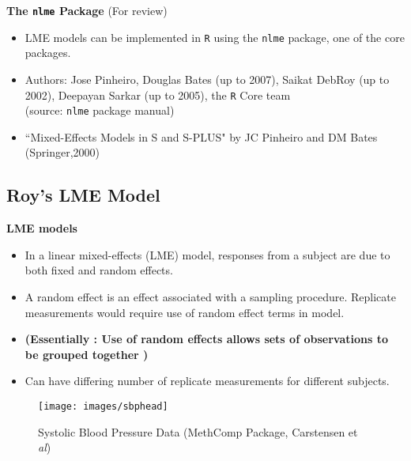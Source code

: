 \documentclass[compress]{beamer}        %
\makeatletter
\newcommand{\tcb}{\textcolor{beamer@blendedblue}}
\makeatother
\begin{document}
		\begin{frame}{\bf \tcb{The \texttt{nlme} Package}}
			(For review)
			\begin{itemize}
				\item LME models can be implemented in \texttt{R} using the \texttt{nlme} package, one of the core packages.\\
				\item Authors: Jose Pinheiro, Douglas Bates (up to 2007), Saikat
				DebRoy (up to 2002), Deepayan Sarkar (up to 2005), the \texttt{R} Core team \\(source: \texttt{nlme} package manual)\\
				\item ``Mixed-Effects Models in S and S-PLUS" by JC Pinheiro and DM Bates (Springer,2000)
				
			\end{itemize}
			
		\end{frame}
			\subsection{Roy's LME Model}
		\begin{frame}{\bf \tcb{LME models}}
						\large
			\begin{itemize}\itemsep0.4cm
				\item In a linear mixed-effects (LME) model, responses from a subject are due to both fixed and random
				effects. 
				\item A random effect is an effect associated with a sampling procedure. Replicate measurements would require use of random effect terms in model.
				\item \textbf{(Essentially : Use of random effects allows sets of observations to be grouped together )}
				\item Can have differing number of replicate measurements for different subjects.
			\end{itemize}
		\end{frame}
\begin{frame}
\begin{figure}
\centering
\texttt{[image: images/sbphead]}
\caption{Systolic Blood Pressure Data (MethComp Package, Carstensen et \textit{al})}
\label{fig:sbpsummary}
\end{figure}
\end{frame}
\end{document}
